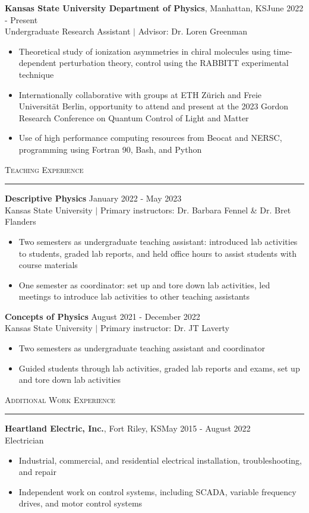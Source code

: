 \documentclass{article}
\newcommand{\sect}[1]{
\noindent\large{\textsc{#1}}\\[-6pt]\normalsize{\noindent\rule{\textwidth}{0.5pt}}
}
\begin{document}
\textbf{Kansas State University Department of Physics}, Manhattan, KS\hfill June 2022 - Present\\
{Undergraduate Research Assistant $ | $ Advisor: Dr. Loren Greenman} \begin{itemize}
	\item Theoretical study of ionization asymmetries in chiral molecules using time-dependent perturbation theory, control using the RABBITT experimental technique
	\item Internationally collaborative with groups at ETH Z\"{u}rich and Freie Universität Berlin, opportunity to attend and present at the 2023 Gordon Research Conference on Quantum Control of Light and Matter
	\item Use of high performance computing resources from Beocat and NERSC, programming using Fortran 90, Bash, and Python
\end{itemize}
\sect{Teaching Experience}
\textbf{Descriptive Physics} \hfill January 2022 - May 2023\\
Kansas State University $ | $ Primary instructors: Dr. Barbara Fennel \& Dr. Bret Flanders
\begin{itemize}
	\item Two semesters as undergraduate teaching assistant: introduced lab activities to students, graded lab reports, and held office hours to assist students with course materials
	\item One semester as coordinator: set up and tore down lab activities, led meetings to introduce lab activities to other teaching assistants
\end{itemize}
\textbf{Concepts of Physics} \hfill August 2021 - December 2022\\
Kansas State University $ | $ Primary instructor: Dr. JT Laverty
\begin{itemize}
	\item Two semesters as undergraduate teaching assistant and coordinator
	\item Guided students through lab activities, graded lab reports and exams, set up and tore down lab activities\vspace{-12pt}
\end{itemize}
\sect{Additional Work Experience}
\textbf{Heartland Electric, Inc.}, Fort Riley, KS\hfill May 2015 - August 2022\\
Electrician\begin{itemize}
	\item Industrial, commercial, and residential electrical installation, troubleshooting, and repair
	\item Independent work on control systems, including SCADA, variable frequency drives, and motor control systems
\end{itemize}
\end{document}
